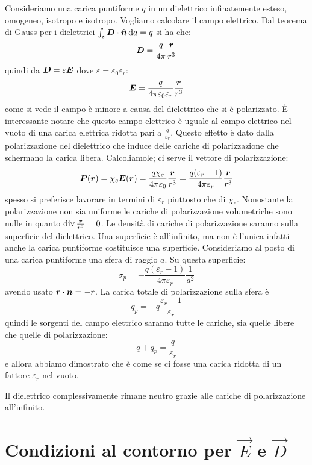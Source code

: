 \begin{Es}
  Consideriamo una carica puntiforme $q$ in un dielettrico infinatemente esteso, omogeneo, isotropo e isotropo. Vogliamo calcolare il campo elettrico. Dal teorema di Gauss per i dielettrici $\int_s\boldsymbol{D}\cdot\boldsymbol{\hat {n}}\,\mathrm{d} a=q$ si ha che:
  \[
    \boldsymbol{D} = \frac{q}{4\pi}\frac{\boldsymbol{r}}{r^3}
  \]
  quindi da $\boldsymbol{D}=\varepsilon\boldsymbol{E}$ dove $\varepsilon=\varepsilon_0\varepsilon_r$:
  \[
    \boldsymbol{E} = \frac{q}{4\pi\varepsilon_0\varepsilon_r}\frac{\boldsymbol{r}}{r^3}
  \]
  come si vede il campo è minore a causa del dielettrico che si è polarizzato. È interessante notare che questo campo elettrico è uguale al campo elettrico nel vuoto di una carica elettrica ridotta pari a $\frac{q}{\varepsilon_r}$. Questo effetto è dato dalla polarizzazione del dielettrico che induce delle cariche di polarizzazione che schermano la carica libera. Calcoliamole; ci serve il vettore di polarizzazione:
  \[
    \boldsymbol{P}(\boldsymbol{r})=\chi_e\boldsymbol{E}(\boldsymbol{r}) = \frac{q\chi_e}{4\pi\varepsilon_0}\frac{\boldsymbol{r}}{r^3}=\frac{q(\varepsilon_r-1)}{4\pi\varepsilon_r}\frac{\boldsymbol{r}}{r^3}
  \]
  spesso si preferisce lavorare in termini di $\varepsilon_r$ piuttosto che di $\chi_e$. Nonostante la polarizzazione non sia uniforme le cariche di polarizzazione volumetriche sono nulle in quanto $\operatorname{div} \frac{\boldsymbol{r}}{r^3}=0$. Le densità di cariche di polarizzazione saranno sulla superficie del dielettrico. Una superficie è all'infinito, ma non è l'unica infatti anche la carica puntiforme costituisce una superficie. Consideriamo al posto di una carica puntiforme una sfera di raggio $a$. Su questa superficie:
  \[
    \sigma_p = -\frac{q(\varepsilon_r-1)}{4\pi\varepsilon_r}\frac{1}{a^2}
  \]
  avendo usato $\boldsymbol{r}\cdot\boldsymbol{n}=-r$. La carica totale di polarizzazione sulla sfera è
  \[
    q_p = -q\frac{\varepsilon_r-1}{\varepsilon_r}
  \]
  quindi le sorgenti del campo elettrico saranno tutte le cariche, sia quelle libere che quelle di polarizzazione:
  \[
    q + q_p = \frac{q}{\varepsilon_r}
  \]
  e allora abbiamo dimostrato che è come se ci fosse una carica ridotta di un fattore $\varepsilon_r$ nel vuoto.

  Il dielettrico complessivamente rimane neutro grazie alle cariche di polarizzazione all'infinito.
\end{Es}

\section{Condizioni al contorno per \texorpdfstring{$\vec E$}{E} e \texorpdfstring{$\vec D$}{D}}
